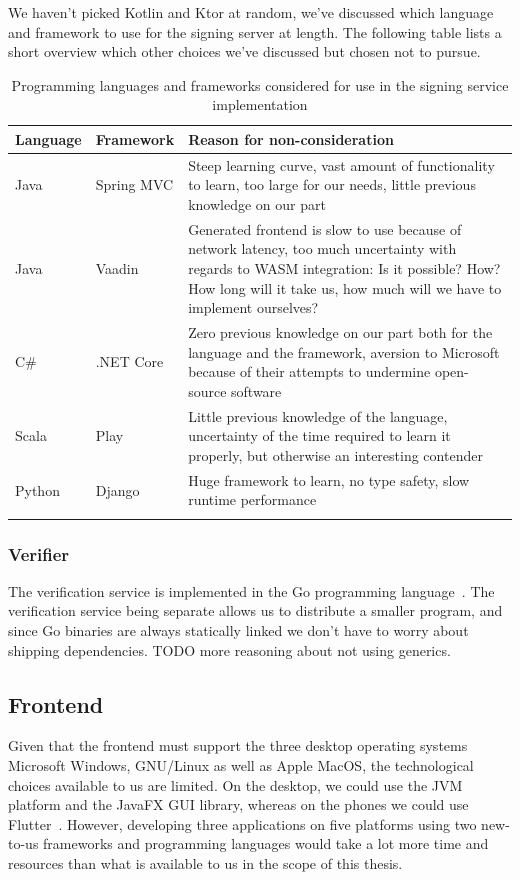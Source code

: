 We haven't picked Kotlin and Ktor at random, we've discussed which language and framework to use for the signing server at length.
The following table lists a short overview which other choices we've discussed but chosen not to pursue.

\begin{longtable}{p{1.5cm}p{2cm}p{11cm}}
    \hline
    \textbf{Language} & \textbf{Framework} & \textbf{Reason for non-consideration} \\ \hline
    Java & Spring MVC & Steep learning curve, vast amount of functionality to learn, too large for our needs, little previous knowledge on our part \\ \hline
    Java & Vaadin & Generated frontend is slow to use because of network latency, too much uncertainty with regards to \gls{WASM} integration: Is it possible? How? How long will it take us, how much will we have to implement ourselves? \\ \hline
    C\# & .NET Core & Zero previous knowledge on our part both for the language and the framework, aversion to Microsoft because of their attempts to undermine open-source software~\cite{mseee} \\ \hline
    Scala & Play & Little previous knowledge of the language, uncertainty of the time required to learn it properly, but otherwise an interesting contender \\ \hline
    Python & Django & Huge framework to learn, no type safety, slow runtime performance \\ \hline
    \caption{Programming languages and frameworks considered for use in the signing service implementation}
\end{longtable}


\subsubsection{Verifier}
The verification service is implemented in the Go programming language~\cite{golang}.
The verification service being separate allows us to distribute a smaller program,
and since Go binaries are always statically linked we don't have to worry about shipping dependencies.
TODO more reasoning about not using generics.


\subsection{Frontend}
\label{subsec:techfrontend}

Given that the frontend must support the three desktop operating systems Microsoft Windows,
GNU/Linux as well as Apple MacOS,
the technological choices available to us are limited.
On the desktop, we could use the \gls{JVM} platform and the JavaFX \gls{GUI} library, whereas on the phones
we could use Flutter~\cite{flutterframework}.
However, developing three applications on five platforms using two new-to-us frameworks and programming languages
would take a lot more time and resources than what is available to us in the scope of this thesis.

